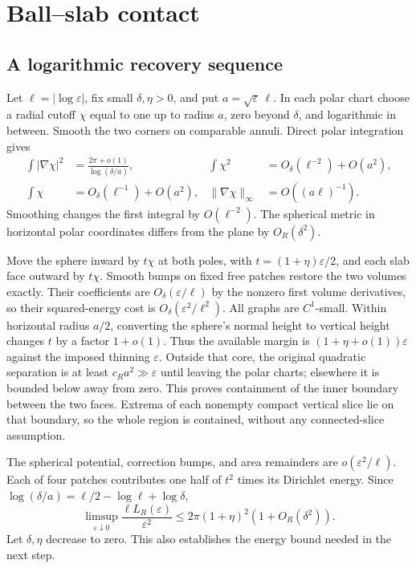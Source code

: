 \documentclass[11pt,reqno]{amsart}
\numberwithin{equation}{section}
\theoremstyle{definition}
\theoremstyle{remark}
\newcommand{\eps}{\varepsilon}
\begin{document}
\section{Ball--slab contact}
\subsection{A logarithmic recovery sequence}\label{sec:slab-upper}
Let $\ell=|\log\eps|$, fix small $\delta,\eta>0$, and put
$a=\sqrt\eps\,\ell$. In each polar chart choose a radial cutoff
$\chi$ equal to one up to radius $a$, zero beyond $\delta$, and
logarithmic in between. Smooth the two corners on comparable annuli.
Direct polar integration gives
\begin{align*}
 \int|\nabla\chi|^2&=\frac{2\pi+o(1)}{\log(\delta/a)},&
 \int\chi^2&=O_\delta(\ell^{-2})+O(a^2),\\
 \int\chi&=O_\delta(\ell^{-1})+O(a^2),&
 \|\nabla\chi\|_\infty&=O((a\ell)^{-1}).
\end{align*}
Smoothing changes the first integral by $O(\ell^{-2})$.
The spherical metric in horizontal polar coordinates differs from the
plane by $O_R(\delta^2)$.

Move the sphere inward by $t\chi$ at both poles, with
$t=(1+\eta)\eps/2$, and each slab face outward by $t\chi$.
Smooth bumps on fixed free patches restore the two volumes exactly.
Their coefficients are $O_\delta(\eps/\ell)$ by the nonzero first
volume derivatives, so their squared-energy cost is
$O_\delta(\eps^2/\ell^2)$. All graphs are $C^1$-small.
Within horizontal radius $a/2$, converting the sphere's normal
height to vertical height changes $t$ by a factor $1+o(1)$.
Thus the available margin is $(1+\eta+o(1))\eps$ against the imposed
thinning $\eps$. Outside that core, the original quadratic separation
is at least $c_Ra^2\gg\eps$ until leaving the polar charts; elsewhere
it is bounded below away from zero. This proves containment of the
inner boundary between the two faces. Extrema of each nonempty compact
vertical slice lie on that boundary, so the whole region is contained,
without any connected-slice assumption.

The spherical potential, correction bumps, and area remainders are
$o(\eps^2/\ell)$. Each of four patches contributes one half of
$t^2$ times its Dirichlet energy. Since
$\log(\delta/a)=\ell/2-\log\ell+\log\delta$,
\[
 \limsup_{\eps\downarrow0}\frac{\ell L_R(\eps)}{\eps^2}
 \le2\pi(1+\eta)^2(1+O_R(\delta^2)).
\]
Let $\delta,\eta$ decrease to zero. This also establishes the energy
bound needed in the next step.
\end{document}
